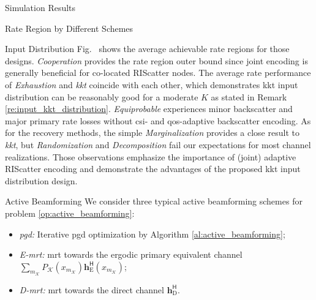 \documentclass[journal]{IEEEtran}
\begin{document}
\begin{section}{Simulation Results}
\begin{subsection}{Rate Region by Different Schemes}
\begin{subsubsection}{Input Distribution}
			Fig.~ shows the average achievable rate regions for those designs.
			\emph{Cooperation} provides the rate region outer bound since joint encoding is generally beneficial for co-located RIScatter nodes.
			The average rate performance of \emph{Exhaustion} and \emph{\gls{kkt}} coincide with each other, which demonstrates \gls{kkt} input distribution can be reasonably good for a moderate $K$ as stated in Remark \ref{re:input_kkt_distribution}.
			\emph{Equiprobable} experiences minor backscatter and major primary rate losses without \gls{csi}- and \gls{qos}-adaptive backscatter encoding.
			As for the recovery methods, the simple \emph{Marginalization} provides a close result to \emph{\gls{kkt}}, but \emph{Randomization} and \emph{Decomposition} fail our expectations for most channel realizations.
			Those observations emphasize the importance of (joint) adaptive RIScatter encoding and demonstrate the advantages of the proposed \gls{kkt} input distribution design.
		\end{subsubsection}

		\begin{subsubsection}{Active Beamforming}
			We consider three typical active beamforming schemes for problem \eqref{op:active_beamforming}:
			\begin{itemize}
				\item \emph{\gls{pgd}:} Iterative \gls{pgd} optimization by Algorithm \ref{al:active_beamforming};
				\item \emph{E-\gls{mrt}:} \gls{mrt} towards the ergodic primary equivalent channel $\sum_{m_{\mathcal{K}}} P_{\mathcal{K}}(x_{m_{\mathcal{K}}}) \boldsymbol{h}_{\text{E}}^\mathsf{H}(x_{m_{\mathcal{K}}})$;
				\item \emph{D-\gls{mrt}:} \gls{mrt} towards the direct channel $\boldsymbol{h}_{\text{D}}^\mathsf{H}$.
			\end{itemize}


\end{subsubsection}
\end{subsection}
\end{section}
\end{document}

